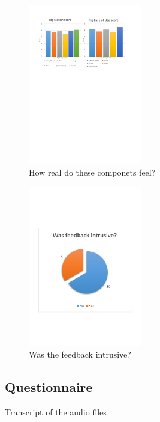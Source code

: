 \begin{figure}[!htb]
	\centering
	\includegraphics[height=7cm]{charts/realistic.pdf}
	\caption{How real do these componets feel?}
\label{fig:chart-realistic}
\end{figure}

\begin{figure}[!htb]
	\centering
	\includegraphics[height=7cm]{charts/intrusivefeedback.pdf}
	\caption{Was the feedback intrusive?}
\label{fig:chart-intrusivefeedback}
\end{figure}

\subsection{Questionnaire}




Transcript of the audio files